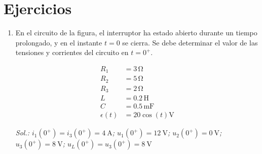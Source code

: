 \section{Ejercicios}

\begin{enumerate}

\item En el circuito de la figura, el interruptor ha estado abierto durante un tiempo
prolongado, y en el instante $t = 0$ se cierra. Se debe determinar el valor de las tensiones y corrientes del circuito en $t = 0^+$.

\begin{minipage}{0.5\linewidth}
\end{minipage}
\begin{minipage}{0.5\linewidth}
  \begin{align*}
    R_1 &= 3\,\unit{\ohm}\\
    R_2 &= 5\,\unit{\ohm}\\
    R_3 &= 2\,\unit{\ohm}\\
    L &= 0.2\,\unit{\henry}\\
    C &= 0.5\,\unit{\milli\farad}\\
    \epsilon(t) &= 20\cos(t)\unit{\volt}
  \end{align*}
\end{minipage}

\vspace{2mm}
\emph{Sol.:\;   $i_1(0^+) = i_3(0^+) = \qty{4}{\ampere}$;\; 
  $u_1(0^+) = \qty{12}{\volt}$;\;
  $u_2(0^+) = \qty{0}{\volt}$;\;
  $u_3(0^+) = \qty{8}{\volt}$;\;
  $u_L(0^+) = u_3(0^+) = \qty{8}{\volt}$
}


\end{enumerate}
